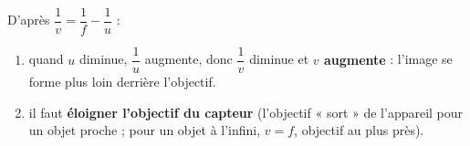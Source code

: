\documentclass[11pt,a4paper]{article}
\begin{document}
\begin{corrige}
D'après $\dfrac{1}{v}=\dfrac{1}{f}-\dfrac{1}{u}$ :
\begin{enumerate}[label=\alph*)]
  \item quand $u$ diminue, $\dfrac{1}{u}$ augmente, donc $\dfrac{1}{v}$ diminue et \textbf{$v$ augmente}
        : l'image se forme plus loin derrière l'objectif.
  \item il faut \textbf{éloigner l'objectif du capteur} (l'objectif « sort » de l'appareil pour un
        objet proche ; pour un objet à l'infini, $v=f$, objectif au plus près).
\end{enumerate}
\end{corrige}
\end{document}
